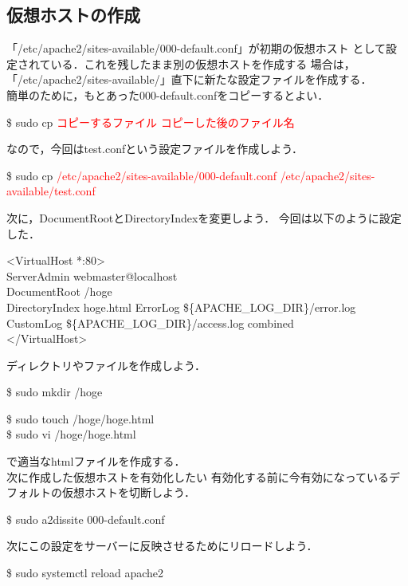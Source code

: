 \documentclass[dvipdfmx,a4paper,11pt]{jsbook}
\begin{document}
\subsection{仮想ホストの作成}
「/etc/apache2/sites-available/000-default.conf」が初期の仮想ホスト
として設定されている．これを残したまま別の仮想ホストを作成する
場合は，「/etc/apache2/sites-available/」直下に新たな設定ファイルを作成する．\\
簡単のために，もとあった000-default.confをコピーするとよい．
\begin{tcolorbox}[terminalbox]
  \$ sudo cp \textcolor{red}{コピーするファイル} \textcolor{red}{コピーした後のファイル名}
\end{tcolorbox}
なので，今回はtest.confという設定ファイルを作成しよう．
\begin{tcolorbox}[terminalbox]
  \$ sudo cp \textcolor{red}{/etc/apache2/sites-available/000-default.conf} \textcolor{red}{/etc/apache2/sites-available/test.conf}
\end{tcolorbox}
次に，DocumentRootとDirectoryIndexを変更しよう．
今回は以下のように設定した．
\begin{tcolorbox}[terminalbox]
  <VirtualHost *:80>\\
  \qquad ServerAdmin webmaster@localhost\\
  \qquad DocumentRoot /hoge\\
  \qquad DirectoryIndex hoge.html
  \qquad ErrorLog \$\{APACHE\_LOG\_DIR\}/error.log\\
  \qquad CustomLog \$\{APACHE\_LOG\_DIR\}/access.log combined\\
  </VirtualHost>
\end{tcolorbox}
ディレクトリやファイルを作成しよう．
\begin{tcolorbox}[terminalbox]
  \$ sudo mkdir /hoge
\end{tcolorbox}
\begin{tcolorbox}[terminalbox]
  \$ sudo touch /hoge/hoge.html\\
  \$ sudo vi /hoge/hoge.html
\end{tcolorbox}
で適当なhtmlファイルを作成する．\\
次に作成した仮想ホストを有効化したい
有効化する前に今有効になっているデフォルトの仮想ホストを切断しよう．
\begin{tcolorbox}[terminalbox]
  \$ sudo a2dissite 000-default.conf
\end{tcolorbox}
次にこの設定をサーバーに反映させるためにリロードしよう．
\begin{tcolorbox}[terminalbox]
  \$ sudo systemctl reload apache2
\end{tcolorbox}
\end{document}
